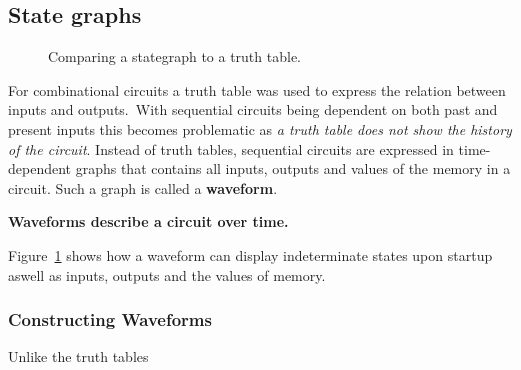 \documentclass[12pt, a4paper, oneside]{memoir}
\newcommand{\attention}[1]{\begin{center}\colorbox{attention}{\textbf{#1}}\end{center}}
\begin{document}
\subsection{State graphs}
\begin{figure}[ht]
  \centering
  \caption{Comparing a stategraph to a truth table.}
  \label{fig:wavevstruth}
  
  \hspace{20pt}
\end{figure}



\noindent
For combinational circuits a truth table was used to express the relation between inputs and outputs.\ With sequential circuits being dependent on both past and present inputs this becomes problematic as \textit{a truth table does not show the history of the circuit}.
Instead of truth tables, sequential circuits are expressed in time-dependent graphs that contains all inputs, outputs and values of the memory in a circuit. Such a graph is called a \textbf{waveform}.
\attention{Waveforms describe a circuit over time.}
Figure~\ref{fig:wavevstruth} shows how a waveform can display indeterminate states upon startup aswell as inputs, outputs and the values of memory.

\subsubsection{Constructing Waveforms}
Unlike the truth tables 
\end{document}
